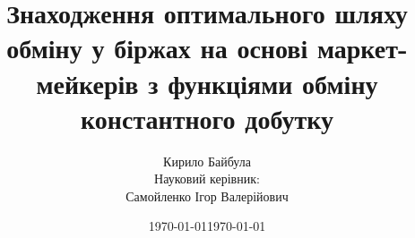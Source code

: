 \documentclass{beamer}
\author{Кирило Байбула\\
        Науковий керівник:\\
        Самойленко Ігор Валерійович}
\date{\today}
\title{Знаходження оптимального шляху обміну у біржах на основі маркет-мейкерів з функціями обміну константного добутку}
\institute{\textbf{КНУ ім. Тараса Шевченка}}
\date{\today}
\begin{document}
\begin{frame}
\titlepage{}
\end{frame}







\end{document}
